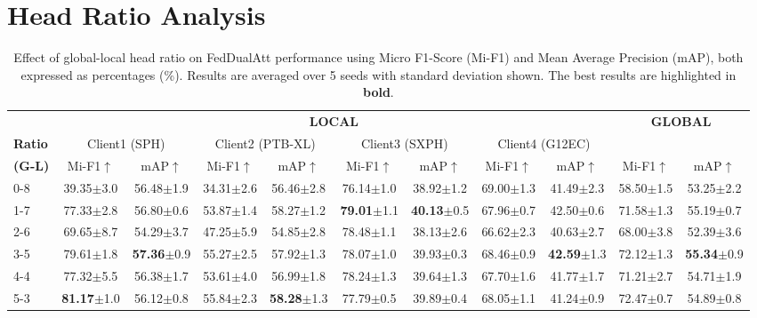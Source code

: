 \documentclass[11pt]{article}
\begin{document}
\section{Head Ratio Analysis}

\begin{table}[h!]
\centering
\caption{Effect of global-local head ratio on FedDualAtt performance using Micro F1-Score (Mi-F1) and Mean Average Precision (mAP), both expressed as percentages (\%). Results are averaged over 5 seeds with standard deviation shown. The best results are highlighted in \textbf{bold}.}
\label{tab:head_ratio}
\small
\begin{tabular}{l|cc|cc|cc|cc|cc}
\toprule
 & \multicolumn{8}{c|}{\textbf{LOCAL}} & \multicolumn{2}{c}{\textbf{GLOBAL}} \\
\cmidrule{2-11}
\textbf{Ratio} & \multicolumn{2}{c|}{Client1 (SPH)} & \multicolumn{2}{c|}{Client2 (PTB-XL)} & \multicolumn{2}{c|}{Client3 (SXPH)} & \multicolumn{2}{c|}{Client4 (G12EC)} & \multicolumn{2}{c}{} \\
\textbf{(G-L)} & Mi-F1$\uparrow$ & mAP$\uparrow$ & Mi-F1$\uparrow$ & mAP$\uparrow$ & Mi-F1$\uparrow$ & mAP$\uparrow$ & Mi-F1$\uparrow$ & mAP$\uparrow$ & Mi-F1$\uparrow$ & mAP$\uparrow$ \\
\midrule
0-8 & 39.35$\pm$3.0 & 56.48$\pm$1.9 & 34.31$\pm$2.6 & 56.46$\pm$2.8 & 76.14$\pm$1.0 & 38.92$\pm$1.2 & 69.00$\pm$1.3 & 41.49$\pm$2.3 & 58.50$\pm$1.5 & 53.25$\pm$2.2 \\
1-7 & 77.33$\pm$2.8 & 56.80$\pm$0.6 & 53.87$\pm$1.4 & 58.27$\pm$1.2 & \textbf{79.01}$\pm$1.1 & \textbf{40.13}$\pm$0.5 & 67.96$\pm$0.7 & 42.50$\pm$0.6 & 71.58$\pm$1.3 & 55.19$\pm$0.7 \\
2-6 & 69.65$\pm$8.7 & 54.29$\pm$3.7 & 47.25$\pm$5.9 & 54.85$\pm$2.8 & 78.48$\pm$1.1 & 38.13$\pm$2.6 & 66.62$\pm$2.3 & 40.63$\pm$2.7 & 68.00$\pm$3.8 & 52.39$\pm$3.6 \\
3-5 & 79.61$\pm$1.8 & \textbf{57.36}$\pm$0.9 & 55.27$\pm$2.5 & 57.92$\pm$1.3 & 78.07$\pm$1.0 & 39.93$\pm$0.3 & 68.46$\pm$0.9 & \textbf{42.59}$\pm$1.3 & 72.12$\pm$1.3 & \textbf{55.34}$\pm$0.9 \\
4-4 & 77.32$\pm$5.5 & 56.38$\pm$1.7 & 53.61$\pm$4.0 & 56.99$\pm$1.8 & 78.24$\pm$1.3 & 39.64$\pm$1.3 & 67.70$\pm$1.6 & 41.77$\pm$1.7 & 71.21$\pm$2.7 & 54.71$\pm$1.9 \\
\rowcolor{lightgray}
5-3 & \textbf{81.17}$\pm$1.0 & 56.12$\pm$0.8 & 55.84$\pm$2.3 & \textbf{58.28}$\pm$1.3 & 77.79$\pm$0.5 & 39.89$\pm$0.4 & 68.05$\pm$1.1 & 41.24$\pm$0.9 & 72.47$\pm$0.7 & 54.89$\pm$0.8 \\

\end{tabular}
\end{table}
\end{document}
